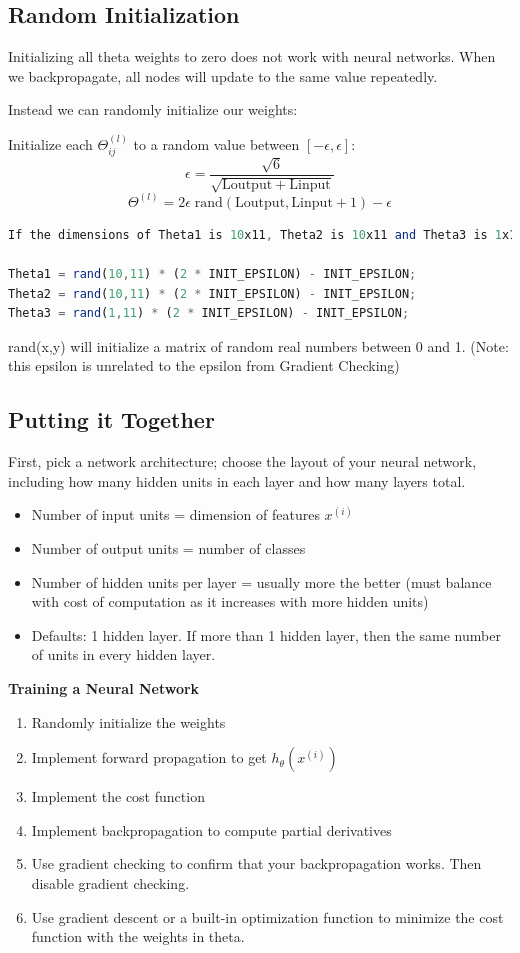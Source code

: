 \documentclass{article}
\begin{document}
\subsection{Random Initialization}
Initializing all theta weights to zero does not work with neural networks. When we backpropagate, all nodes will update to the same value repeatedly.

Instead we can randomly initialize our weights:

Initialize each $\Theta^{(l)}_{ij}$ to a random value between $[-\epsilon,\epsilon]$:
$$\epsilon = \dfrac{\sqrt{6}}{\sqrt{\mathrm{Loutput} + \mathrm{Linput}}}$$
$$\Theta^{(l)} =  2 \epsilon \; \mathrm{rand}(\mathrm{Loutput}, \mathrm{Linput} + 1)    - \epsilon$$

\begin{lstlisting}[language=Octave]
If the dimensions of Theta1 is 10x11, Theta2 is 10x11 and Theta3 is 1x11.

Theta1 = rand(10,11) * (2 * INIT_EPSILON) - INIT_EPSILON;
Theta2 = rand(10,11) * (2 * INIT_EPSILON) - INIT_EPSILON;
Theta3 = rand(1,11) * (2 * INIT_EPSILON) - INIT_EPSILON;
\end{lstlisting}

rand(x,y) will initialize a matrix of random real numbers between 0 and 1. (Note: this epsilon is unrelated to the epsilon from Gradient Checking)

\subsection{Putting it Together}
First, pick a network architecture; choose the layout of your neural network, including how many hidden units in each layer and how many layers total.
\begin{itemize}
	\item Number of input units = dimension of features $x^{(i)}$
	\item Number of output units = number of classes
	\item Number of hidden units per layer = usually more the better (must balance with cost of computation as it increases with more hidden units)
	\item Defaults: 1 hidden layer. If more than 1 hidden layer, then the same number of units in every hidden layer.
\end{itemize}

\textbf{Training a Neural Network}

\begin{enumerate}
	\item Randomly initialize the weights
	\item Implement forward propagation to get $h_\theta(x^{(i)})$
	\item Implement the cost function
	\item Implement backpropagation to compute partial derivatives
	\item Use gradient checking to confirm that your backpropagation works. Then disable gradient checking.
	\item Use gradient descent or a built-in optimization function to minimize the cost function with the weights in theta.
\end{enumerate}
\end{document}
